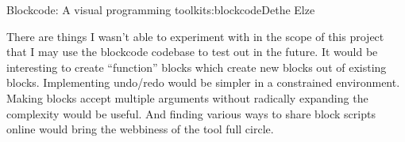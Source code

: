 \begin{aosachapter}{Blockcode: A visual programming toolkit}{s:blockcode}{Dethe Elze}
\label{a-program-is-a-process-not-a-thing}

There are things I wasn't able to experiment with in the scope of this
project that I may use the blockcode codebase to test out in the future.
It would be interesting to create ``function'' blocks which create new
blocks out of existing blocks. Implementing undo/redo would be simpler
in a constrained environment. Making blocks accept multiple arguments
without radically expanding the complexity would be useful. And finding
various ways to share block scripts online would bring the webbiness of
the tool full circle.

\end{aosachapter}
